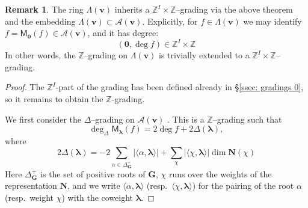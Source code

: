 \documentclass[11pt,reqno]{amsart}
\renewcommand{\mathbf}{\mathbold}
\numberwithin{equation}{section}
\theoremstyle{definition}
\newtheorem{Remark}[equation]{Remark}
\newcommand{\cA}{\mathcal{A}}
\newcommand{\bG}{\mathbf{G}}
\newcommand{\bN}{\mathbf{N}}
\newcommand{\bv}{\mathbf{v}}
\newcommand{\ZZ}{\mathbb{Z}}
\renewcommand{\bv}{\mathbf{v}} %
\newcommand{\M}{\mathsf{M}}
\newcommand{\vertexset}{I}
\newcommand{\GT}{\Lambda}
\newcommand{\bla}{{\boldsymbol{\lambda}}}
\newcommand{\qzast}{\cA}
\begin{document}
\begin{Remark}
\label{rem: degrees GT}
The ring $\GT(\bv)$ inherits a $\ZZ^\vertexset\times \ZZ$--grading via the above theorem and the embedding $\GT(\bv)\subset \qzast(\bv)$. Explicitly, for $f \in \GT(\bv)$ we  may identify  $f = \M_{\mathbf{0}}(f) \in \qzast(\bv)$, and it has degree:
$$
(\mathbf{0}, \deg f) \in \ZZ^{\vertexset} \times \ZZ
$$
In other words, the $\ZZ$--grading on $\GT(\bv)$ is trivially extended to a $\ZZ^\vertexset\times \ZZ$--grading.
\end{Remark}
\begin{proof}
The $\ZZ^\vertexset$-part of the grading has been defined already in \S \ref{ssec: gradings 0}, so it remains to obtain the $\ZZ$-grading. 

We first consider the $\Delta$--grading on $\qzast(\bv)$ \cite[Remark 2.8]{BFN1}.  This is a $\ZZ$--grading such that
$$
\deg_\Delta \M_{\bla}(f) = 2 \deg f + 2\Delta(\bla),
$$
where
\begin{equation}
\label{eq: Delta grading1}
2\Delta(\bla) = - 2\sum_{\alpha \in \Delta^+_\bG} | \langle \alpha, \bla\rangle| +  \sum_{\chi} |\langle\chi, \bla\rangle| \dim \bN(\chi)
\end{equation}
Here $\Delta^+_\bG$ is the set of positive roots of $\bG$, $\chi$ runs over the weights of the representation $\bN$, and we write $\langle \alpha,\bla\rangle$  (resp.~$\langle\chi, \bla\rangle$) for the pairing of the root $\alpha$ (resp.~weight $\chi$) with the coweight $\bla$.  


\end{proof}
\end{document}
